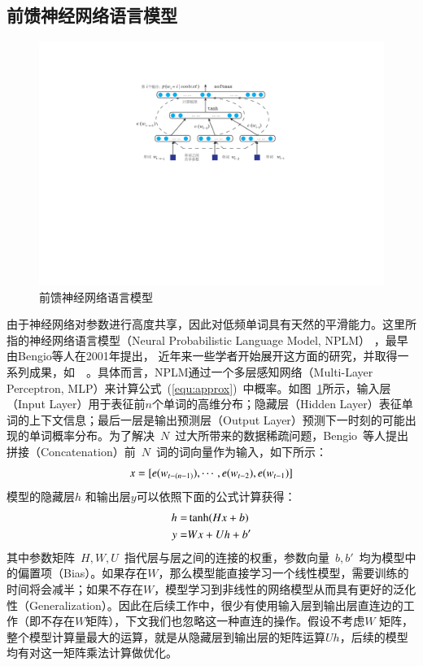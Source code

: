 \subsection{前馈神经网络语言模型}
\begin{figure}
  \centering
  \includegraphics[width=.85\linewidth]{./figures/nplm.pdf}
  \caption{前馈神经网络语言模型}\label{fig:nplm}
\end{figure}
由于神经网络对参数进行高度共享，因此对低频单词具有天然的平滑能力。这里所指的神经网络语言模型（Neural Probabilistic Language Model, NPLM） ，最早由Bengio等人在2001年提出， 近年来一些学者开始展开这方面的研究，并取得一系列成果，如~\cite{DBLP:conf/acl/BaroniDK14,DBLP:journals/sigkdd/BellK07,DBLP:journals/pami/BengioCV13,DBLP:journals/tnn/BengioSF94}~。具体而言，NPLM通过一个多层感知网络（Multi-Layer Perceptron, MLP）来计算公式~(\ref{equ:approx})~中概率。如图~\ref{fig:nplm}所示，输入层（Input Layer）用于表征前$n$个单词的高维分布；隐藏层（Hidden Layer）表征单词的上下文信息；最后一层是输出预测层（Output Layer）预测下一时刻的可能出现的单词概率分布。为了解决~$N$~过大所带来的数据稀疏问题，Bengio~等人提出拼接（Concatenation）前~$N$~词的词向量作为输入，如下所示：
\begin{equation}\label{equ:we}
\setlength{\abovedisplayskip}{6pt}
\setlength{\belowdisplayskip}{6pt}
  x = [e(w_{t-(n-1)}), \cdots , e(w_{t-2}), e{(w_{t-1})}]
\end{equation}
模型的隐藏层$h$ 和输出层$y$可以依照下面的公式计算获得：
\begin{equation}\label{equ:nplm}
\setlength{\abovedisplayskip}{6pt}
\setlength{\belowdisplayskip}{6pt}
\begin{split}
h =& \tanh(Hx+b) \\
y =&Wx + Uh +b'
\end{split}
\end{equation}
其中参数矩阵~$H,W,U$~指代层与层之间的连接的权重，参数向量~$b,b'$~均为模型中的偏置项（Bias）。如果存在$W$，那么模型能直接学习一个线性模型，需要训练的时间将会减半；如果不存在$W$，模型学习到非线性的网络模型从而具有更好的泛化性（Generalization）。因此在后续工作中，很少有使用输入层到输出层直连边的工作（即不存在$W$矩阵），下文我们也忽略这一种直连的操作。假设不考虑$W$ 矩阵，整个模型计算量最大的运算，就是从隐藏层到输出层的矩阵运算$Uh$，后续的模型均有对这一矩阵乘法计算做优化。

